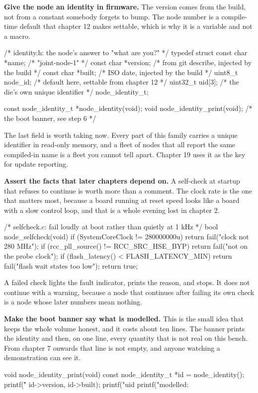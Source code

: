 \begin{steps}
\item \textbf{Give the node an identity in firmware.} The version comes from the
build, not from a constant somebody forgets to bump. The node number is a
compile-time default that chapter 12 makes settable, which is why it is a
variable and not a macro.
\begin{ccode}
/* identity.h: the node's answer to "what are you?" */
typedef struct {
    const char *name;        /* "joint-node-1" */
    const char *version;     /* from git describe, injected by the build */
    const char *built;       /* ISO date, injected by the build */
    uint8_t     node_id;     /* default here, settable from chapter 12 */
    uint32_t    uid[3];      /* the die's own unique identifier */
} node_identity_t;

const node_identity_t *node_identity(void);
void node_identity_print(void);   /* the boot banner, see step 6 */
\end{ccode}
The last field is worth taking now. Every part of this family carries a unique
identifier in read-only memory, and a fleet of nodes that all report the same
compiled-in name is a fleet you cannot tell apart. Chapter 19 uses it as the
key for update reporting.

\item \textbf{Assert the facts that later chapters depend on.} A self-check at
startup that refuses to continue is worth more than a comment. The clock rate is
the one that matters most, because a board running at reset speed looks like a
board with a slow control loop, and that is a whole evening lost in chapter 2.
\begin{ccode}
/* selfcheck.c: fail loudly at boot rather than quietly at 1 kHz */
bool node_selfcheck(void)
{
    if (SystemCoreClock != 280000000u)        return fail("clock not 280 MHz");
    if (rcc_pll_source() != RCC_SRC_HSE_BYP)  return fail("not on the probe clock");
    if (flash_latency() < FLASH_LATENCY_MIN)  return fail("flash wait states too low");
    return true;
}
\end{ccode}
A failed check lights the fault indicator, prints the reason, and stops. It does
not continue with a warning, because a node that continues after failing its own
check is a node whose later numbers mean nothing.

\item \textbf{Make the boot banner say what is modelled.} This is the small idea
that keeps the whole volume honest, and it costs about ten lines. The banner
prints the identity and then, on one line, every quantity that is not real on
this bench. From chapter 7 onwards that line is not empty, and anyone watching a
demonstration can see it.
\begin{ccode}
void node_identity_print(void)
{
    const node_identity_t *id = node_identity();
    printf("\r\n%
           id->version, id->built);
    printf("uid %
    printf("modelled: %
}
\end{ccode}


\end{steps}
